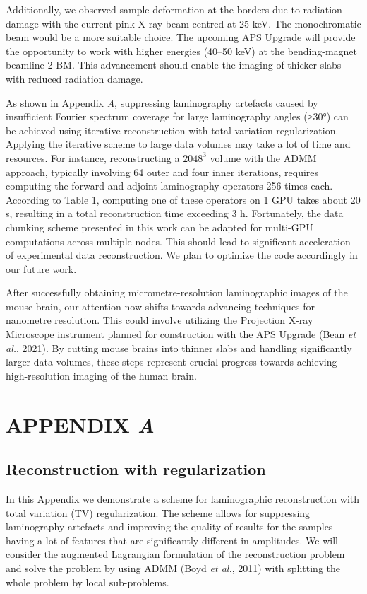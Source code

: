 \documentclass{article}
\begin{document}
Additionally, we observed sample deformation at the borders due to radiation damage with the current pink X-ray beam centred at 25 keV. The monochromatic beam would be a more suitable choice. The upcoming APS Upgrade will provide the opportunity to work with higher energies (40–50 keV) at the bending-magnet beamline 2-BM. This advancement should enable the imaging of thicker slabs with reduced radiation damage.

As shown in Appendix \emph{A}, suppressing laminography artefacts caused by insufficient Fourier spectrum coverage for large laminography angles (≥30°) can be achieved using iterative reconstruction with total variation regularization. Applying the iterative scheme to large data volumes may take a lot of time and resources. For instance, reconstructing a $2048^3$ volume with the ADMM approach, typically involving 64 outer and four inner iterations, requires computing the forward and adjoint laminography operators 256 times each. According to Table 1, computing one of these operators on 1 GPU takes about 20 s, resulting in a total reconstruction time exceeding 3 h. Fortunately, the data chunking scheme presented in this work can be adapted for multi-GPU computations across multiple nodes. This should lead to significant acceleration of experimental data reconstruction. We plan to optimize the code accordingly in our future work.

After successfully obtaining micrometre-resolution laminographic images of the mouse brain, our attention now shifts towards advancing techniques for nanometre resolution. This could involve utilizing the Projection X-ray Microscope instrument planned for construction with the APS Upgrade (Bean \emph{et al.}, 2021). By cutting mouse brains into thinner slabs and handling significantly larger data volumes, these steps represent crucial progress towards achieving high-resolution imaging of the human brain.

\section*{APPENDIX \emph{A}}

\subsection*{Reconstruction with regularization}

In this Appendix we demonstrate a scheme for laminographic reconstruction with total variation (TV) regularization. The scheme allows for suppressing laminography artefacts and improving the quality of results for the samples having a lot of features that are significantly different in amplitudes. We will consider the augmented Lagrangian formulation of the reconstruction problem and solve the problem by using ADMM (Boyd \emph{et al.}, 2011) with splitting the whole problem by local sub-problems.
\end{document}
